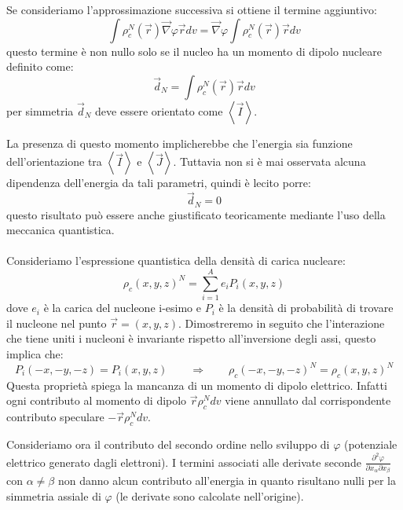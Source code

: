 Se consideriamo l'approssimazione successiva si ottiene il termine aggiuntivo:
\begin{equation}
\int \rho^{N}_c{(\vec{r})} \vec{\nabla} \varphi \vec{r} dv = \vec{\nabla} 
\varphi \int \rho^{N}_c{(\vec{r})} \vec{r} dv
\end{equation}
questo termine è non nullo solo se il nucleo ha un momento di dipolo nucleare 
definito come:
\begin{equation}
\vec{d}_N = \int \rho^{N}_c{(\vec{r})} \vec{r} dv
\end{equation}
per simmetria $\vec{d}_N$ deve essere orientato come $\left\langle \vec{I} 
\right\rangle$.

La presenza di questo momento implicherebbe che l'energia sia funzione
dell'orientazione tra $\left\langle \vec{I} \right\rangle$ e $\left\langle
\vec{J} \right\rangle$. Tuttavia non si è mai osservata alcuna dipendenza
dell'energia da tali parametri, quindi è lecito porre:
\begin{equation}
\vec{d}_N = 0
\end{equation}
questo risultato può essere anche giustificato teoricamente mediante l'uso 
della
meccanica quantistica.
\\
\\
Consideriamo l'espressione quantistica della densità di carica nucleare:
\begin{equation}
\rho_c{(x,y,z)}^N = \sum_{i=1}^A e_i P_i{(x,y,z)}
\end{equation}
dove $e_i$ è la carica del nucleone i-esimo e $P_i$ è la densità di 
probabilità
di trovare il nucleone nel punto $\vec{r} = (x,y,z)$.
Dimostreremo in seguito che l'interazione che tiene uniti i nucleoni è
invariante rispetto all'inversione degli assi, questo implica che:
\begin{equation}
P_i{(-x,-y,-z)} = P_i{(x,y,z)} \qquad \Rightarrow \qquad \rho_c{(-x,-y,-z)}^N = 
\rho_c{(x,y,z)}^N
\end{equation}
Questa proprietà spiega la mancanza di un momento di dipolo elettrico. Infatti
ogni contributo al momento di dipolo $\vec{r} \rho_c^N dv$ viene annullato dal
corrispondente contributo speculare $- \vec{r} \rho_c^N dv$.

Consideriamo ora il contributo del secondo ordine nello sviluppo di $\varphi$
(potenziale elettrico generato dagli elettroni). I termini associati alle
derivate seconde $\frac{\partial^2 \varphi}{\partial x_{\alpha} \partial
x_{\beta}}$ con $\alpha \ne \beta$ non danno alcun contributo all'energia in
quanto risultano nulli per la simmetria assiale di $\varphi$ (le derivate sono
calcolate nell'origine).

